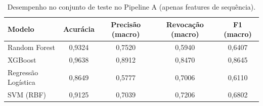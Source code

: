 \begin{table}[htbp]
  \centering
  \caption{Desempenho no conjunto de teste no Pipeline A (apenas features de sequência).}
  \label{tab:pipeline_a}
  \begin{tabular}{lcccc}
    \toprule
    Modelo & Acurácia & Precisão (macro) & Revocação (macro) & F1 (macro) \\
    \midrule
    Random Forest & 0,9324 & 0,7520 & 0,5940 & 0,6407 \\
    XGBoost & 0,9638 & 0,8912 & 0,8470 & 0,8645 \\
    Regressão Logística & 0,8649 & 0,5777 & 0,7006 & 0,6110 \\
    SVM (RBF) & 0,9125 & 0,7039 & 0,7206 & 0,6802 \\
    \bottomrule
  \end{tabular}
\end{table}
